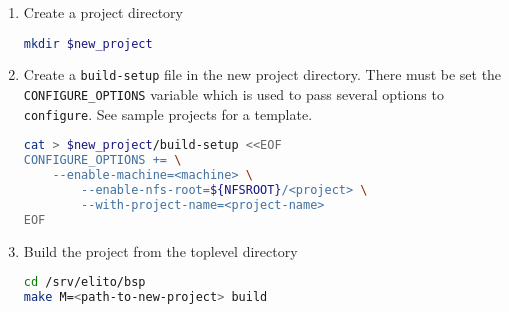 \begin{enumerate}
\item Create a project directory
  \begin{lstlisting}[language=bash]
mkdir $new_project
  \end{lstlisting}%
\item Create a \texttt{build-setup} file in the new project
  directory. There must be set the \texttt{CONFIGURE\_OPTIONS}
  variable which is used to pass several options to
  \texttt{configure}.  See sample projects for a template.
  \begin{lstlisting}[language=bash]
cat > $new_project/build-setup <<EOF
CONFIGURE_OPTIONS += \
	--enable-machine=<machine> \
        --enable-nfs-root=${NFSROOT}/<project> \
        --with-project-name=<project-name>
EOF
  \end{lstlisting}
\item Build the project from the toplevel directory
  \begin{lstlisting}[language=bash]
cd /srv/elito/bsp
make M=<path-to-new-project> build
  \end{lstlisting}
\end{enumerate}

